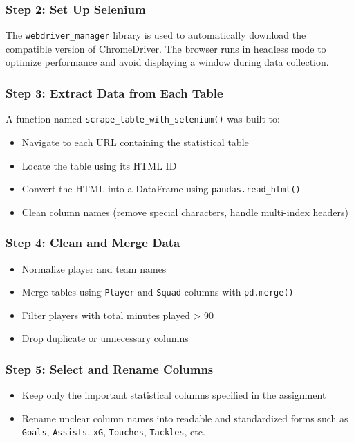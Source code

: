 \documentclass[12pt,a4paper]{article}
\begin{document}
\subsubsection{Step 2: Set Up Selenium}
The \texttt{webdriver\_manager} library is used to automatically download the compatible version of ChromeDriver.  
The browser runs in headless mode to optimize performance and avoid displaying a window during data collection.

\subsubsection{Step 3: Extract Data from Each Table}
A function named \texttt{scrape\_table\_with\_selenium()} was built to:
\begin{itemize}
\item Navigate to each URL containing the statistical table
\item Locate the table using its HTML ID
\item Convert the HTML into a DataFrame using \texttt{pandas.read\_html()}
\item Clean column names (remove special characters, handle multi-index headers)
\end{itemize}

\subsubsection{Step 4: Clean and Merge Data}
\begin{itemize}
\item Normalize player and team names
\item Merge tables using \texttt{Player} and \texttt{Squad} columns with \texttt{pd.merge()}
\item Filter players with total minutes played > 90
\item Drop duplicate or unnecessary columns
\end{itemize}

\subsubsection{Step 5: Select and Rename Columns}
\begin{itemize}
\item Keep only the important statistical columns specified in the assignment
\item Rename unclear column names into readable and standardized forms such as \texttt{Goals}, \texttt{Assists}, \texttt{xG}, \texttt{Touches}, \texttt{Tackles}, etc.
\end{itemize}
\end{document}
